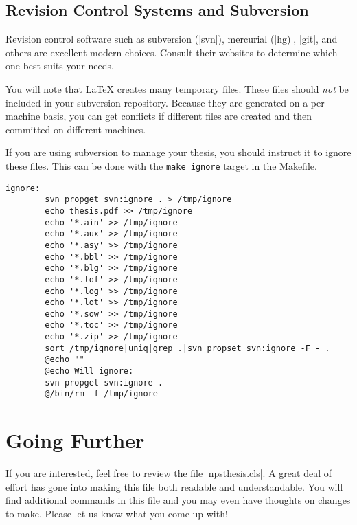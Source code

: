\subsection{Revision Control Systems and Subversion}
Revision control software such as subversion (|svn|), mercurial (|hg)|, |git|, and others are excellent modern choices.  
Consult their websites to determine which one best suits your needs.

You will note that \LaTeX{} creates many temporary files. These files should \emph{not} be
included in your subversion repository. Because they are generated on a
per-machine basis, you can get conflicts if different files are
created and then committed on different machines.

If you are using subversion to manage your thesis, you should instruct it to ignore these files.  This
can be done with the \texttt{make ignore} target in the Makefile.

\begin{Verbatim}
ignore:
        svn propget svn:ignore . > /tmp/ignore
        echo thesis.pdf >> /tmp/ignore
        echo '*.ain' >> /tmp/ignore
        echo '*.aux' >> /tmp/ignore
        echo '*.asy' >> /tmp/ignore
        echo '*.bbl' >> /tmp/ignore
        echo '*.blg' >> /tmp/ignore
        echo '*.lof' >> /tmp/ignore
        echo '*.log' >> /tmp/ignore
        echo '*.lot' >> /tmp/ignore
        echo '*.sow' >> /tmp/ignore
        echo '*.toc' >> /tmp/ignore
        echo '*.zip' >> /tmp/ignore
        sort /tmp/ignore|uniq|grep .|svn propset svn:ignore -F - .
        @echo ""
        @echo Will ignore:
        svn propget svn:ignore .
        @/bin/rm -f /tmp/ignore
\end{Verbatim}



\section{Going Further}
If you are interested, feel free to review the file
|npsthesis.cls|. A great deal of effort has gone into making this
file both readable and understandable. You will find additional
commands in this file and you may even have thoughts on changes to
make. Please let us know what you come up with!


